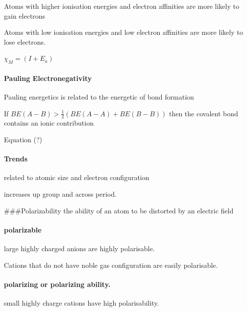 \documentclass[]{article}
\let\oldparagraph\paragraph
\renewcommand{\paragraph}[1]{\oldparagraph{#1}\mbox{}}
\begin{document}
Atoms with higher ionisation energies and electron affinities are more
likely to gain electrons

Atoms with low ionisation energies and low electron affinities are more
likely to lose electrons.

\(\chi_{M}=(I+E_{a})\)

\hypertarget{pauling-electronegativity}{%
\paragraph{Pauling Electronegativity}\label{pauling-electronegativity}}

Pauling energetics is related to the energetic of bond formation

If \(BE(A-B)>\frac{1}{2}(BE(A-A)+BE(B-B))\) then the covalent bond
contains an ionic contribution

Equation (?)

\hypertarget{trends-3}{%
\paragraph{Trends}\label{trends-3}}

related to atomic size and electron configuration

increases up group and across period.

\#\#\#Polarizability the ability of an atom to be distorted by an
electric field

\hypertarget{polarizable}{%
\paragraph{polarizable}\label{polarizable}}

large highly charged anions are highly polarisable.

Cations that do not have noble gas configuration are easily polarisable.

\hypertarget{polarizing-or-polarizing-ability.}{%
\paragraph{polarizing or polarizing
ability.}\label{polarizing-or-polarizing-ability.}}

small highly charge cations have high polarisability.
\end{document}
